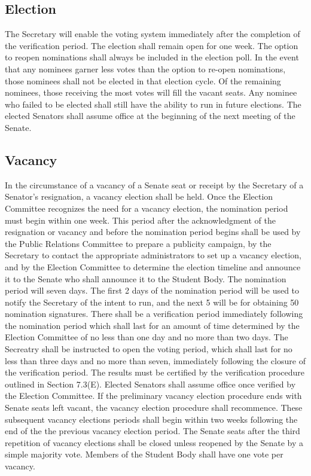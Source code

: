\documentclass[12pt]{scrreprt}
\begin{document}
\subsection{Election}
The Secretary will enable the voting system 
immediately after the completion of the verification period. The election 
shall remain open for one week. The option to reopen nominations shall always be included in the election poll. In the event that any nominees garner less votes than the option to re-open nominations, those nominees shall not be elected in that election cycle. Of the remaining nominees, those receiving the most votes will fill the vacant seats. Any nominee who failed to be elected shall still have the ability to run in future elections. The elected Senators shall assume office at the beginning of the next meeting of the Senate.

\subsection{Vacancy}
In the circumstance of a vacancy of a Senate seat or receipt by the Secretary of a
Senator’s resignation, a vacancy election shall be held. Once the Election
Committee recognizes the need for a vacancy election, the nomination period must
begin within one week. This period after the acknowledgment of the resignation or
vacancy and before the nomination period begins shall be used by the Public
Relations Committee to prepare a publicity campaign, by the Secretary to contact
the appropriate administrators to set up a vacancy election, and by the Election
Committee to determine the election timeline and announce it to the Senate who
shall announce it to the Student Body. The nomination period will seven 
days. The first 2 days of the nomination period will be used to notify the Secretary of the intent to run, and the next 5 will be for obtaining 50 nomination signatures. There shall be a verification period immediately following the nomination period which shall last for an amount of time determined
by the Election Committee of no less than one day and no more than two days. The Secreatry shall be instructed to open the voting period, which shall
last for  no less than three days and no more than seven​, immediately following the closure of the verification period.
The results must be certified by the verification procedure outlined in Section
7.3(E). Elected Senators shall assume office once verified by the Election
Committee. If the preliminary vacancy election procedure ends with Senate seats left vacant,
the vacancy election procedure shall recommence. These subsequent vacancy
elections periods shall begin within two weeks following the end of the the
previous vacancy election period. The Senate seats after the third
repetition of vacancy elections shall be closed unless reopened by the Senate by a simple majority vote. Members of the Student Body shall have one vote
per vacancy.
\end{document}
